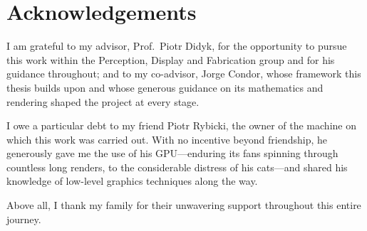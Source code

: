 \chapter*{Acknowledgements}

I am grateful to my advisor, Prof.\ Piotr Didyk, for the opportunity to pursue this work within the
Perception, Display and Fabrication group and for his guidance throughout; and to my co-advisor, Jorge
Condor, whose framework this thesis builds upon and whose generous guidance on its mathematics and
rendering shaped the project at every stage.

I owe a particular debt to my friend Piotr Rybicki, the owner of the machine on which this work was
carried out. With no incentive beyond friendship, he generously gave me the use of his GPU---enduring
its fans spinning through countless long renders, to the considerable distress of his cats---and shared
his knowledge of low-level graphics techniques along the way.

Above all, I thank my family for their unwavering support throughout this entire journey.
